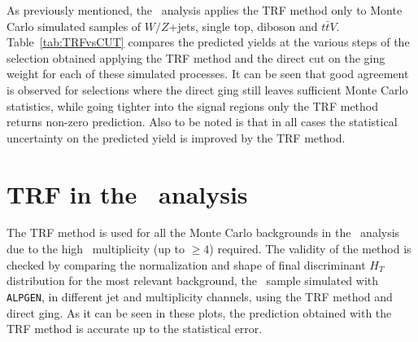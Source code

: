 As previously mentioned, the \wbx\ analysis applies the
TRF method only to Monte Carlo simulated samples of
$W/Z$+jets, single top, diboson and $t\bar{t}V$.
Table~\ref{tab:TRFvsCUT} compares the predicted yields 
at the various steps of the selection obtained
applying the TRF method and the direct cut on the
\btag ging weight for each of these simulated
processes. It can be seen that good agreement
is observed for selections where the direct \btag ging
still leaves sufficient Monte Carlo statistics,
while going tighter into the signal regions only
the TRF method returns non-zero prediction.
Also to be noted is that in all cases
the statistical uncertainty on the predicted yield is
improved by the TRF method.


\section{TRF in the \htx\ analysis}

The TRF method is used for all the Monte Carlo backgrounds in the
\htx\ analysis due to the high \btag\ multiplicity
(up to $\geq 4$) required. The validity of the method is checked by comparing 
the normalization and shape of final discriminant $H_T$ distribution
for the most relevant background, the \ttbar\ sample simulated with
\texttt{ALPGEN}, in different jet and \bjet multiplicity channels,
using the TRF method and direct \btag ging.
As it can be seen in these plots, the prediction obtained with the TRF 
method is accurate up to the statistical error.



